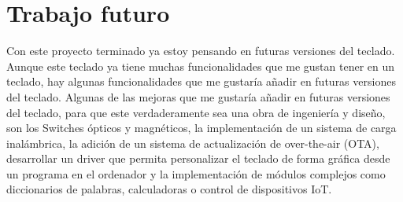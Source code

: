 \section{Trabajo futuro}
Con este proyecto terminado ya estoy pensando en futuras versiones del teclado. Aunque este teclado ya tiene muchas funcionalidades que me gustan tener en un teclado, hay algunas funcionalidades que me gustaría añadir en futuras versiones del teclado. Algunas de las mejoras que me gustaría añadir en futuras versiones del teclado, para que este verdaderamente sea una obra de ingeniería y diseño, son los \gls{Switches} ópticos y magnéticos, la implementación de un sistema de carga inalámbrica, la adición de un sistema de actualización de  over-the-air (OTA), desarrollar un driver que permita personalizar el teclado de forma gráfica desde un programa en el ordenador y la implementación de módulos complejos como diccionarios de palabras, calculadoras o control de dispositivos \gls{IoT}.